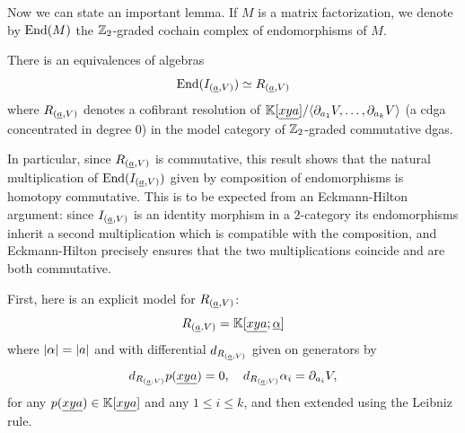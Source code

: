 Now we can state an important lemma. If $M$ is a matrix factorization, we denote by $\mathrm{End}(M)$ the $\mathbb{Z}_2$-graded cochain complex of endomorphisms of $M$.
\begin{lmm} \label{lmm:quasi-iso-end}
	There is an equivalences of algebras
	\begin{equation*}
		\mathrm{End}(I_{(\underline{a}, V)}) \simeq R_{(\underline{a}, V)}
	\end{equation*}
	where $R_{(\underline{a}, V)}$ denotes a cofibrant resolution of $\mathbb{K}[\underline{xya}]/\langle \partial_{a_1} V, \dotsc, \partial_{a_k} V \rangle$ (a cdga concentrated in degree $0$) in the model category of $\mathbb{Z}_2$-graded commutative dgas.
\end{lmm}

In particular, since $R_{(\underline{a}, V)}$ is commutative, this result shows that the natural multiplication of $\mathrm{End}(I_{(\underline{a}, V)})$ given by composition of endomorphisms is homotopy commutative. This is to be expected from an Eckmann-Hilton argument: since $I_{(\underline{a}, V)}$ is an identity morphism in a $2$-category its endomorphisms inherit a second multiplication which is compatible with the composition, and Eckmann-Hilton precisely ensures that the two multiplications coincide and are both commutative.

First, here is an explicit model for $R_{(\underline{a}, V)}$:
\begin{equation*}
	R_{(\underline{a}, V)} = \mathbb{K}[\underline{xya}; \underline{\alpha}]
\end{equation*}
where $\left\lvert \alpha \right\rvert = \left\lvert a \right\rvert$ and with differential $d_{R_{(\underline{a};V)}}$ given on generators by
\begin{equation*}
	d_{R_{(\underline{a};V)}} p(\underline{xya}) = 0, \quad d_{R_{(\underline{a};V)}}\alpha_i = \partial_{a_i} V,
\end{equation*}
for any $p(\underline{xya}) \in \mathbb{K}[\underline{xya}]$ and any $1 \leq i \leq k$, and then extended using the Leibniz rule.

